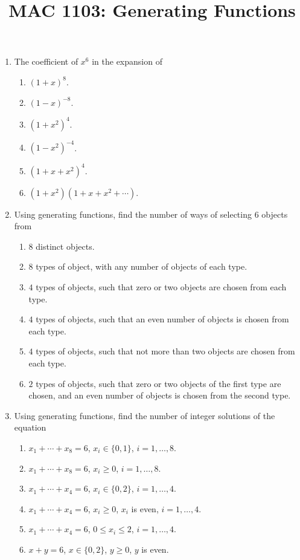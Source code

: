 \documentclass[svgnames]{amsart}
\title{MAC 1103: Generating Functions}
\date{}
\begin{document}
\maketitle
\begin{enumerate}[leftmargin=*]
\item The coefficient of $x^6$ in the expansion of
\begin{enumerate}[label=(\roman*)]
	\item $(1 + x)^8$.
	\item $(1 - x)^{-8}$.
	\item $(1 + x^2)^4$.
	\item $(1 - x^2)^{-4}$.
	\item $(1 + x + x^2)^4$.
	\item $(1 + x^2)(1 + x + x^2 + \cdots)$.
\end{enumerate}

\item Using generating functions, find the number of ways of selecting $6$ objects from
\begin{enumerate}[label=(\roman*)]
	\item $8$ distinct objects.
	\item $8$ types of object, with any number of objects of each type.
	\item $4$ types of objects, such that zero or two objects are chosen from each type.
	\item $4$ types of objects, such that an even number of objects is chosen from each type.
	\item $4$ types of objects, such that not more than two objects are chosen from each type.
	\item $2$ types of objects, such that zero or two objects of the first type are chosen, and an even number of objects is chosen from the second type.
\end{enumerate}

\item Using generating functions, find the number of integer solutions of the equation
\begin{enumerate}[label=(\roman*)]
	\item $x_1 + \cdots + x_8 = 6$, $x_i \in \{0, 1\}$, $i = 1, \ldots, 8$.
	\item $x_1 + \cdots + x_8 = 6$, $x_i \ge 0$, $i = 1, \ldots, 8$.
	\item $x_1 + \cdots + x_4 = 6$, $x_i \in \{0, 2\}$, $i = 1, \ldots, 4$.
	\item $x_1 + \cdots + x_4 = 6$, $x_i \ge 0$, $x_i$ is even, $i = 1, \ldots, 4$.
	\item $x_1 + \cdots + x_4 = 6$, $0 \le x_i \le 2$, $i = 1, \ldots, 4$.
	\item $x + y = 6$, $x \in \{0, 2\}$, $y \ge 0$, $y$ is even.
\end{enumerate}


\end{enumerate}
\end{document}
